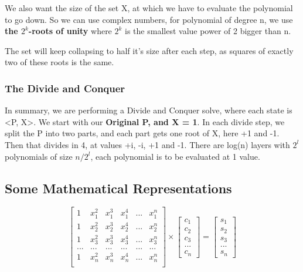 We also want the size of the set X, at which we have to evaluate the polynomial to go down. So we can use complex numbers, for polynomial of degree n, we use \textbf{the $2^k$-roots of unity} where $2^k$ is the smallest value power of 2 bigger than n.

The set will keep collapsing to half it's size after each step, as squares of exactly two of these roots is the same.

\subsubsection{The Divide and Conquer}
In summary, we are performing a Divide and Conquer solve, where each state is <P, X>.
We start with our \textbf{Original P, and X = 1}. In each divide step, we split the P into two parts, and each part gets one root of X, here +1 and -1. Then that divides in 4, at values +i, -i, +1 and -1. There are log(n) layers with $2^l$ polynomials of size $n/2^l$, each polynomial is to be evaluated at 1 value.


\subsection{Some Mathematical Representations}

\begin{equation}
  \begin{bmatrix}
    1 & x_1^2 & x_1^3 & x_1^4 & ... & x_1^n \\
    1 & x_2^2 & x_2^3 & x_2^4 & ... & x_2^n \\
    1 & x_3^2 & x_3^3 & x_3^4 & ... & x_3^n \\
    ... & ... &  ...  &  ...  & ... &  ...  \\
    1 & x_n^2 & x_n^3 & x_n^4 & ... & x_n^n \\
  \end{bmatrix} \times
  \begin{bmatrix}
    c_1 \\ c_2 \\ c_3 \\ ... \\ c_n
  \end{bmatrix} =
  \begin{bmatrix}
    s_1 \\ s_2 \\ s_3 \\ ... \\ s_n
  \end{bmatrix}
\end{equation}

